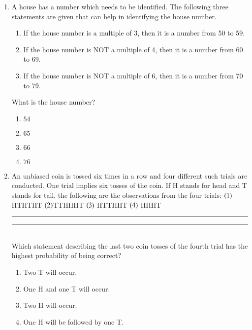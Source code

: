 \documentclass[journal,12pt,onecolumn]{IEEEtran}
\theoremstyle{remark}
\begin{document}
\begin{enumerate}
\begin{multicols}{4}
\end{multicols}
\item A house has a number which needs to be identified. The following three statements are
given that can help in identifying the house number.
\begin{enumerate}[label=\roman*.]
\item If the house number is a multiple of 3, then it is a number from 50 to 59.
\item  If the house number is NOT a multiple of 4, then it is a number from 60 to 69.
\item  If the house number is NOT a multiple of 6, then it is a number from 70 to 79.
\end{enumerate}
What is the house number?
\begin{multicols}{4}
    \begin{enumerate}
        \item $54$ \item $65$ \item $66$ \item $76$
    \end{enumerate}
\end{multicols}
\item An unbiased coin is tossed six times in a row and four different such trials are conducted.
One trial implies six tosses of the coin. If H stands for head and T stands for tail, the
following are the observations from the four trials:
$\left(1\right)$ HTHTHT $\left(2\right)$TTHHHT $\left(3\right)$ HTTHHT $\left(4\right)$ HHHT\rule{0.5cm}{0.14mm} \rule{0.5cm}{0.14mm}\\
Which statement describing the last two coin tosses of the fourth trial has the highest
probability of being correct?
\begin{enumerate}
\item  Two T will occur.
\item  One H and one T will occur.
\item  Two H will occur.
\item  One H will be followed by one T.
\end{enumerate}
\end{enumerate}
\end{document}
